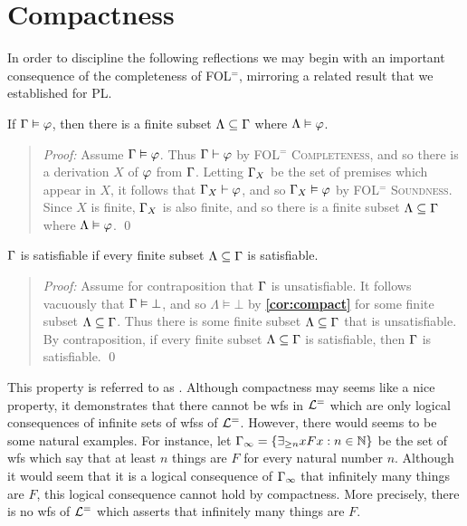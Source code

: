 \section{Compactness}%
  \label{sec:Compactness}

In order to discipline the following reflections we may begin with an important consequence of the completeness of FOL$^=$, mirroring a related result that we established for PL.

\begin{Cthm} \label{cor:compact}
  If $\Gamma\vDash\varphi$, then there is a finite subset $\Lambda\subseteq\Gamma$ where $\Lambda\vDash\varphi$.
\end{Cthm}

\begin{quote} 
  \textit{Proof:} 
  Assume $\Gamma\vDash\varphi$.  
  Thus $\Gamma\vdash\varphi$ by \textsc{FOL$^=$ Completeness}, and so there is a derivation $X$ of $\varphi$ from $\Gamma$.
  Letting $\Gamma_X$ be the set of premises which appear in $X$, it follows that $\Gamma_X\vdash\varphi$, and so $\Gamma_X\vDash\varphi$ by \textsc{FOL$^=$ Soundness}.
  Since $X$ is finite, $\Gamma_X$ is also finite, and so there is a finite subset $\Lambda\subseteq\Gamma$ where $\Lambda\vDash\varphi$.
  \qed
\end{quote}



\begin{Cthm}[Compactness] \label{cor:compact2}
  $\Gamma$ is satisfiable if every finite subset $\Lambda\subseteq\Gamma$ is satisfiable.
\end{Cthm}

\begin{quote} 
  \textit{Proof:} 
  Assume for contraposition that $\Gamma$ is unsatisfiable. 
  It follows vacuously that $\Gamma\vDash\bot$, and so $\Lambda\vDash\bot$ by \textbf{\ref{cor:compact}} for some finite subset $\Lambda\subseteq\Gamma$.
  Thus there is some finite subset $\Lambda\subseteq\Gamma$ that is unsatisfiable. 
  By contraposition, if every finite subset $\Lambda\subseteq\Gamma$ is satisfiable, then $\Gamma$ is satisfiable. 
  \qed
\end{quote}


This property is referred to as .
Although compactness may seems like a nice property, it demonstrates that there cannot be wfs in $\mathcal{L}^{=}$ which are only logical consequences of infinite sets of wfss of $\mathcal{L}^{=}$.
However, there would seems to be some natural examples.
For instance, let $\Gamma_\infty=\lbrace\exists_{\geq n}xFx:n\in\mathbb{N}\rbrace$ be the set of wfs which say that at least $n$ things are $F$ for every natural number $n$. 
Although it would seem that it is a logical consequence of $\Gamma_\infty$ that infinitely many things are $F$, this logical consequence cannot hold by compactness.
More precisely, there is no wfs of $\mathcal{L}^{=}$ which asserts that infinitely many things are $F$.

